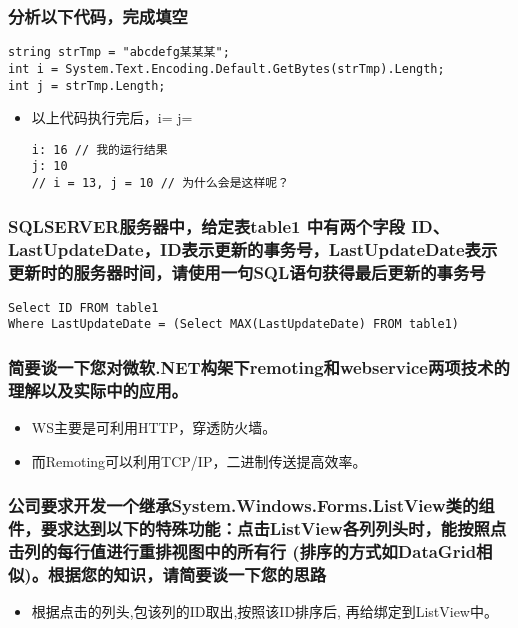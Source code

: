 \documentclass[9pt, b5paper]{article}
\begin{document}
\subsubsection{分析以下代码，完成填空}
\label{sec-1-1-27}
\begin{verbatim}
string strTmp = "abcdefg某某某";
int i = System.Text.Encoding.Default.GetBytes(strTmp).Length;
int j = strTmp.Length;
\end{verbatim}
\begin{itemize}
\item 以上代码执行完后，i= j=
\begin{verbatim}
i: 16 // 我的运行结果 
j: 10
// i = 13, j = 10 // 为什么会是这样呢？
\end{verbatim}
\end{itemize}
\subsubsection{SQLSERVER服务器中，给定表table1 中有两个字段 ID、LastUpdateDate，ID表示更新的事务号，LastUpdateDate表示更新时的服务器时间，请使用一句SQL语句获得最后更新的事务号}
\label{sec-1-1-28}
\begin{verbatim}
Select ID FROM table1 
Where LastUpdateDate = (Select MAX(LastUpdateDate) FROM table1)
\end{verbatim}
\subsubsection{简要谈一下您对微软.NET构架下remoting和webservice两项技术的理解以及实际中的应用。}
\label{sec-1-1-29}
\begin{itemize}
\item WS主要是可利用HTTP，穿透防火墙。
\item 而Remoting可以利用TCP/IP，二进制传送提高效率。
\end{itemize}
\subsubsection{公司要求开发一个继承System.Windows.Forms.ListView类的组件，要求达到以下的特殊功能：点击ListView各列列头时，能按照点击列的每行值进行重排视图中的所有行 (排序的方式如DataGrid相似)。根据您的知识，请简要谈一下您的思路}
\label{sec-1-1-30}
\begin{itemize}
\item 根据点击的列头,包该列的ID取出,按照该ID排序后, 再给绑定到ListView中。
\end{itemize}
\end{document}
